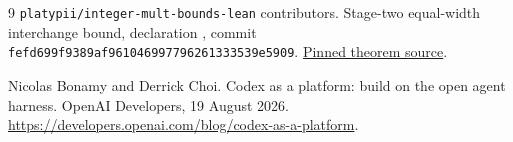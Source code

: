 \documentclass[11pt]{article}
\begin{document}
\begin{thebibliography}{9}
\texttt{platypii/integer-mult-bounds-lean} contributors.
\newblock Stage-two equal-width interchange bound, declaration
,
commit \texttt{fefd699f9389af961046997796261333539e5909}.
\newblock \href{https://github.com/platypii/integer-mult-bounds-lean/blob/fefd699f9389af961046997796261333539e5909/IntegerMultBounds/MathlibTM2/M8/Stage2Machine/Bound.lean}{Pinned theorem source}.

Nicolas Bonamy and Derrick Choi.
\newblock Codex as a platform: build on the open agent harness.
\newblock OpenAI Developers, 19 August 2026.
\newblock \url{https://developers.openai.com/blog/codex-as-a-platform}.
\end{thebibliography}
\endgroup
\end{document}
